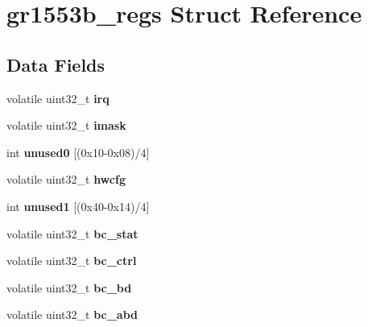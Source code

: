 \hypertarget{structgr1553b__regs}{}\section{gr1553b\+\_\+regs Struct Reference}
\label{structgr1553b__regs}
\subsection*{Data Fields}
\begin{DoxyCompactItemize}
\item 
\mbox{\label{structgr1553b__regs_ab38a4c7660e7bfa689e081cd3de237ce}} 
volatile uint32\+\_\+t {\bfseries irq}
\item 
\mbox{\label{structgr1553b__regs_a435222cc866a2d63f2963d2b162cba9b}} 
volatile uint32\+\_\+t {\bfseries imask}
\item 
\mbox{\label{structgr1553b__regs_ab725cbaae9fe48f370dae925c00571c5}} 
int {\bfseries unused0} \mbox{[}(0x10-\/0x08)/4\mbox{]}
\item 
\mbox{\label{structgr1553b__regs_ae19904662eb1c36f5cc4682e3c842b86}} 
volatile uint32\+\_\+t {\bfseries hwcfg}
\item 
\mbox{\label{structgr1553b__regs_afee8e2d255de8c3ae90e3554fe82fc63}} 
int {\bfseries unused1} \mbox{[}(0x40-\/0x14)/4\mbox{]}
\item 
\mbox{\label{structgr1553b__regs_ab40a8ff786688244045de38b11d25829}} 
volatile uint32\+\_\+t {\bfseries bc\+\_\+stat}
\item 
\mbox{\label{structgr1553b__regs_ac23c0401d7d633a4d59545181b2b695a}} 
volatile uint32\+\_\+t {\bfseries bc\+\_\+ctrl}
\item 
\mbox{\label{structgr1553b__regs_a371fb22b39ea968cd6cd914421cb4343}} 
volatile uint32\+\_\+t {\bfseries bc\+\_\+bd}
\item 
\mbox{\label{structgr1553b__regs_aef619d563dcd9ab65d21929ccd2ed457}} 
volatile uint32\+\_\+t {\bfseries bc\+\_\+abd}

\end{DoxyCompactItemize}
